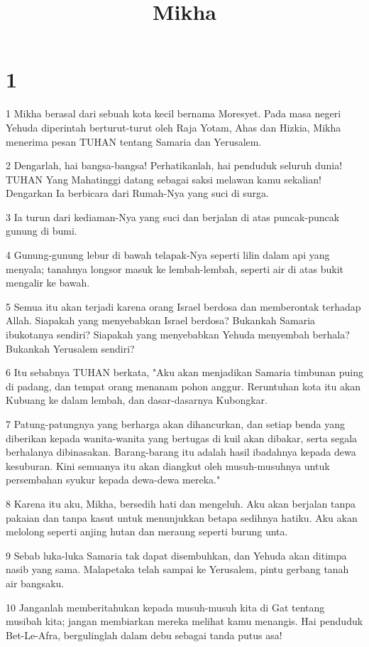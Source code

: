 

\title{Mikha}


\chapter{1}

\par 1 Mikha berasal dari sebuah kota kecil bernama Moresyet. Pada masa negeri Yehuda diperintah berturut-turut oleh Raja Yotam, Ahas dan Hizkia, Mikha menerima pesan TUHAN tentang Samaria dan Yerusalem.
\par 2 Dengarlah, hai bangsa-bangsa! Perhatikanlah, hai penduduk seluruh dunia! TUHAN Yang Mahatinggi datang sebagai saksi melawan kamu sekalian! Dengarkan Ia berbicara dari Rumah-Nya yang suci di surga.
\par 3 Ia turun dari kediaman-Nya yang suci dan berjalan di atas puncak-puncak gunung di bumi.
\par 4 Gunung-gunung lebur di bawah telapak-Nya seperti lilin dalam api yang menyala; tanahnya longsor masuk ke lembah-lembah, seperti air di atas bukit mengalir ke bawah.
\par 5 Semua itu akan terjadi karena orang Israel berdosa dan memberontak terhadap Allah. Siapakah yang menyebabkan Israel berdosa? Bukankah Samaria ibukotanya sendiri? Siapakah yang menyebabkan Yehuda menyembah berhala? Bukankah Yerusalem sendiri?
\par 6 Itu sebabnya TUHAN berkata, "Aku akan menjadikan Samaria timbunan puing di padang, dan tempat orang menanam pohon anggur. Reruntuhan kota itu akan Kubuang ke dalam lembah, dan dasar-dasarnya Kubongkar.
\par 7 Patung-patungnya yang berharga akan dihancurkan, dan setiap benda yang diberikan kepada wanita-wanita yang bertugas di kuil akan dibakar, serta segala berhalanya dibinasakan. Barang-barang itu adalah hasil ibadahnya kepada dewa kesuburan. Kini semuanya itu akan diangkut oleh musuh-musuhnya untuk persembahan syukur kepada dewa-dewa mereka."
\par 8 Karena itu aku, Mikha, bersedih hati dan mengeluh. Aku akan berjalan tanpa pakaian dan tanpa kasut untuk menunjukkan betapa sedihnya hatiku. Aku akan melolong seperti anjing hutan dan meraung seperti burung unta.
\par 9 Sebab luka-luka Samaria tak dapat disembuhkan, dan Yehuda akan ditimpa nasib yang sama. Malapetaka telah sampai ke Yerusalem, pintu gerbang tanah air bangsaku.
\par 10 Janganlah memberitahukan kepada musuh-musuh kita di Gat tentang musibah kita; jangan membiarkan mereka melihat kamu menangis. Hai penduduk Bet-Le-Afra, bergulinglah dalam debu sebagai tanda putus asa!
